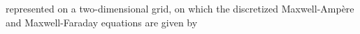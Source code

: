 \documentclass[]{report}
\begin{document}
represented on a two-dimensional grid,
on which the discretized
Maxwell-Amp\`ere and Maxwell-Faraday equations are given by
%
%
%
%
%
%
\end{document}
